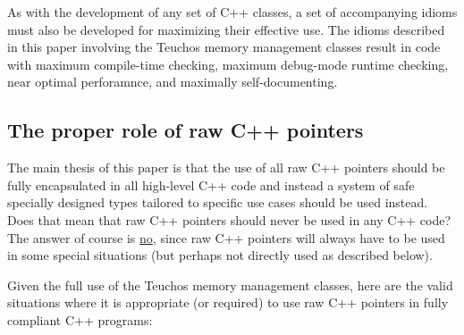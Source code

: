 \documentclass[pdf,ps2pdf,11pt]{SANDreport}
\begin{document}
As with the development of any set of C++ classes, a set of
accompanying idioms must also be developed for maximizing their
effective use.  The idioms described in this paper involving the
Teuchos memory management classes result in code with maximum
compile-time checking, maximum debug-mode runtime checking, near
optimal perforamnce, and maximally self-documenting.


%
{}\subsection{The proper role of raw C++ pointers}
\label{sec:role-of-raw-pointers}
%

The main thesis of this paper is that the use of all raw C++ pointers
should be fully encapsulated in all high-level C++ code and instead a
system of safe specially designed types tailored to specific use cases
should be used instead.  Does that mean that raw C++ pointers should
never be used in any C++ code?  The answer of course is
{}\underline{no}, since raw C++ pointers will always have to be used
in some special situations (but perhaps not directly used as described
below).

Given the full use of the Teuchos memory management classes, here are
the valid situations where it is appropriate (or required) to use raw
C++ pointers in fully compliant C++ programs:
\end{document}
